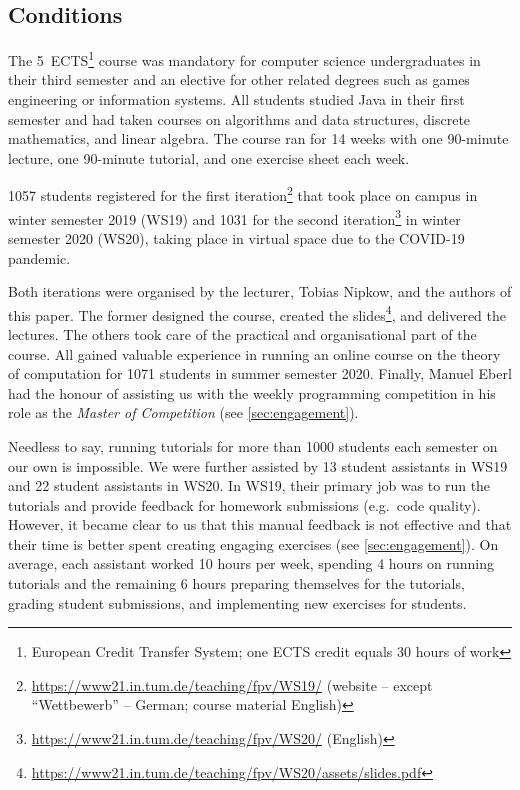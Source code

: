 \subsection{Conditions}

The 5~ECTS\footnote{European Credit Transfer System; one ECTS credit equals 30 hours of work} course was mandatory for computer science undergraduates in their third semester and
an elective for other related degrees such as games engineering or information systems.
All students studied Java in their first semester and had taken courses on algorithms and data structures,
discrete mathematics, and linear algebra.
The course ran for 14 weeks with
one 90-minute lecture,
one 90-minute tutorial,
and one exercise sheet each week.

1057 students registered for
the first iteration\footnote{\url{https://www21.in.tum.de/teaching/fpv/WS19/} (website -- except ``Wettbewerb'' -- German; course material English)} that took place on campus in winter semester 2019 (WS19) and
1031 for the second iteration\footnote{\url{https://www21.in.tum.de/teaching/fpv/WS20/} (English)} in winter semester 2020 (WS20), taking place in virtual space due to the COVID-19 pandemic.

Both iterations were organised by the lecturer, Tobias Nipkow, and the authors of this paper.
The former designed the course, created the slides\footnote{\url{https://www21.in.tum.de/teaching/fpv/WS20/assets/slides.pdf}}, and delivered the lectures.
The others took care of the practical and organisational part of the course.
All gained valuable experience in running an online course on the theory of computation for 1071
students in summer semester 2020.
Finally, Manuel Eberl had the honour of assisting us with the weekly programming competition in his role as the \emph{Master of Competition} (see \cref{sec:engagement}).

Needless to say,
running tutorials for more than 1000
students each semester on our own is impossible.
We were further assisted by
13 student assistants in WS19 and
22 student assistants in WS20.
In WS19, their primary job was to run the tutorials and provide feedback for homework submissions (e.g.\ code quality).
However, it became clear to us
that this manual feedback is not effective
and that their time is better spent creating engaging exercises (see \cref{sec:engagement}).
On average, each assistant worked 10 hours per week,
spending 4 hours on running tutorials
and the remaining 6 hours
preparing themselves for the tutorials,
grading student submissions,
and implementing new exercises for students.


